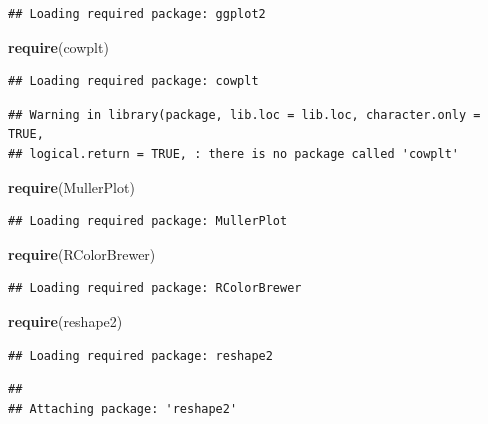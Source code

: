 \documentclass[]{article}
\newenvironment{Shaded}{\begin{snugshade}}{\end{snugshade}}
\newcommand{\KeywordTok}[1]{\textcolor[rgb]{0.13,0.29,0.53}{\textbf{{#1}}}}
\newcommand{\NormalTok}[1]{{#1}}
\begin{document}
\begin{verbatim}
## Loading required package: ggplot2
\end{verbatim}

\begin{Shaded}
\begin{Highlighting}[]
\KeywordTok{require}\NormalTok{(cowplt)}
\end{Highlighting}
\end{Shaded}

\begin{verbatim}
## Loading required package: cowplt
\end{verbatim}

\begin{verbatim}
## Warning in library(package, lib.loc = lib.loc, character.only = TRUE,
## logical.return = TRUE, : there is no package called 'cowplt'
\end{verbatim}

\begin{Shaded}
\begin{Highlighting}[]
\KeywordTok{require}\NormalTok{(MullerPlot)}
\end{Highlighting}
\end{Shaded}

\begin{verbatim}
## Loading required package: MullerPlot
\end{verbatim}

\begin{Shaded}
\begin{Highlighting}[]
\KeywordTok{require}\NormalTok{(RColorBrewer)}
\end{Highlighting}
\end{Shaded}

\begin{verbatim}
## Loading required package: RColorBrewer
\end{verbatim}

\begin{Shaded}
\begin{Highlighting}[]
\KeywordTok{require}\NormalTok{(reshape2)}
\end{Highlighting}
\end{Shaded}

\begin{verbatim}
## Loading required package: reshape2
\end{verbatim}

\begin{verbatim}
## 
## Attaching package: 'reshape2'
\end{verbatim}
\end{document}
